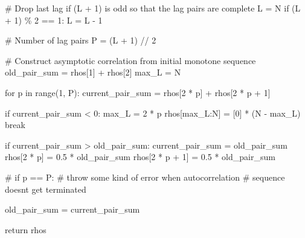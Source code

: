 \documentclass[
  letterpaper,
  DIV=11,
  numbers=noendperiod]{scrartcl}
\newenvironment{Shaded}{\begin{snugshade}}{\end{snugshade}}
\newcommand{\BuiltInTok}[1]{\textcolor[rgb]{0.00,0.23,0.31}{#1}}
\newcommand{\CommentTok}[1]{\textcolor[rgb]{0.37,0.37,0.37}{#1}}
\newcommand{\ControlFlowTok}[1]{\textcolor[rgb]{0.00,0.23,0.31}{#1}}
\newcommand{\DecValTok}[1]{\textcolor[rgb]{0.68,0.00,0.00}{#1}}
\newcommand{\FloatTok}[1]{\textcolor[rgb]{0.68,0.00,0.00}{#1}}
\newcommand{\KeywordTok}[1]{\textcolor[rgb]{0.00,0.23,0.31}{#1}}
\newcommand{\NormalTok}[1]{\textcolor[rgb]{0.00,0.23,0.31}{#1}}
\newcommand{\OperatorTok}[1]{\textcolor[rgb]{0.37,0.37,0.37}{#1}}
\begin{document}
\begin{Shaded}
\begin{Highlighting}[]
  \CommentTok{\# Drop last lag if (L + 1) is odd so that the lag pairs are complete}
\NormalTok{  L }\OperatorTok{=}\NormalTok{ N}
  \ControlFlowTok{if}\NormalTok{ (L }\OperatorTok{+} \DecValTok{1}\NormalTok{) }\OperatorTok{\%} \DecValTok{2} \OperatorTok{==} \DecValTok{1}\NormalTok{:}
\NormalTok{    L }\OperatorTok{=}\NormalTok{ L }\OperatorTok{{-}} \DecValTok{1}

  \CommentTok{\# Number of lag pairs}
\NormalTok{  P }\OperatorTok{=}\NormalTok{ (L }\OperatorTok{+} \DecValTok{1}\NormalTok{) }\OperatorTok{//} \DecValTok{2}

  \CommentTok{\# Construct asymptotic correlation from initial monotone sequence}
\NormalTok{  old\_pair\_sum }\OperatorTok{=}\NormalTok{ rhos[}\DecValTok{1}\NormalTok{] }\OperatorTok{+}\NormalTok{ rhos[}\DecValTok{2}\NormalTok{]}
\NormalTok{  max\_L }\OperatorTok{=}\NormalTok{ N}

  \ControlFlowTok{for}\NormalTok{ p }\KeywordTok{in} \BuiltInTok{range}\NormalTok{(}\DecValTok{1}\NormalTok{, P):}
\NormalTok{    current\_pair\_sum }\OperatorTok{=}\NormalTok{ rhos[}\DecValTok{2} \OperatorTok{*}\NormalTok{ p] }\OperatorTok{+}\NormalTok{ rhos[}\DecValTok{2} \OperatorTok{*}\NormalTok{ p }\OperatorTok{+} \DecValTok{1}\NormalTok{]}

    \ControlFlowTok{if}\NormalTok{ current\_pair\_sum }\OperatorTok{\textless{}} \DecValTok{0}\NormalTok{:}
\NormalTok{      max\_L }\OperatorTok{=} \DecValTok{2} \OperatorTok{*}\NormalTok{ p}
\NormalTok{      rhos[max\_L:N] }\OperatorTok{=}\NormalTok{ [}\DecValTok{0}\NormalTok{] }\OperatorTok{*}\NormalTok{ (N }\OperatorTok{{-}}\NormalTok{ max\_L)}
      \ControlFlowTok{break}

    \ControlFlowTok{if}\NormalTok{ current\_pair\_sum }\OperatorTok{\textgreater{}}\NormalTok{ old\_pair\_sum:}
\NormalTok{      current\_pair\_sum }\OperatorTok{=}\NormalTok{ old\_pair\_sum}
\NormalTok{      rhos[}\DecValTok{2} \OperatorTok{*}\NormalTok{ p]     }\OperatorTok{=} \FloatTok{0.5} \OperatorTok{*}\NormalTok{ old\_pair\_sum}
\NormalTok{      rhos[}\DecValTok{2} \OperatorTok{*}\NormalTok{ p }\OperatorTok{+} \DecValTok{1}\NormalTok{] }\OperatorTok{=} \FloatTok{0.5} \OperatorTok{*}\NormalTok{ old\_pair\_sum}

    \CommentTok{\# if p == P:}
      \CommentTok{\# throw some kind of error when autocorrelation}
      \CommentTok{\# sequence doesn\textquotesingle{}t get terminated}

\NormalTok{    old\_pair\_sum }\OperatorTok{=}\NormalTok{ current\_pair\_sum}

  \ControlFlowTok{return}\NormalTok{ rhos}
\end{Highlighting}
\end{Shaded}
\end{document}
